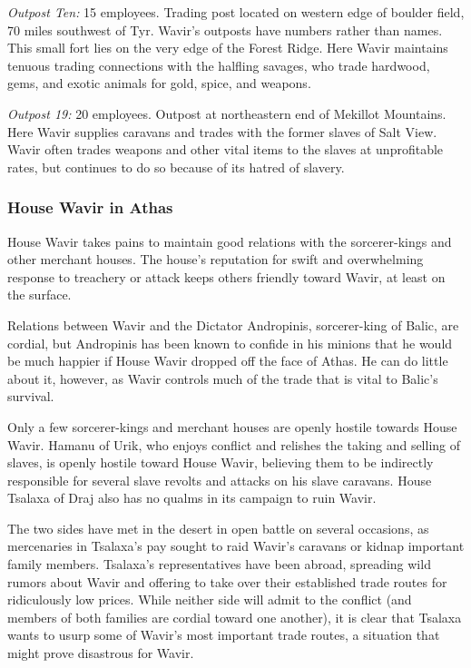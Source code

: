 \textit{Outpost Ten:} 15 employees. Trading post located on western edge of boulder field, 70 miles southwest of Tyr. Wavir's outposts have numbers rather than names. This small fort lies on the very edge of the Forest Ridge. Here Wavir maintains tenuous trading connections with the halfling savages, who trade hardwood, gems, and exotic animals for gold, spice, and weapons.

\textit{Outpost 19:} 20 employees. Outpost at northeastern end of Mekillot Mountains. Here Wavir supplies caravans and trades with the former slaves of Salt View. Wavir often trades weapons and other vital items to the slaves at unprofitable rates, but continues to do so because of its hatred of slavery.

\subsubsection{House Wavir in Athas}
House Wavir takes pains to maintain good relations with the sorcerer-kings and other merchant houses. The house's reputation for swift and overwhelming response to treachery or attack keeps others friendly toward Wavir, at least on the surface.

Relations between Wavir and the Dictator Andropinis, sorcerer-king of Balic, are cordial, but Andropinis has been known to confide in his minions that he would be much happier if House Wavir dropped off the face of Athas. He can do little about it, however, as Wavir controls much of the trade that is vital to Balic's survival.

Only a few sorcerer-kings and merchant houses are openly hostile towards House Wavir. Hamanu of Urik, who enjoys conflict and relishes the taking and selling of slaves, is openly hostile toward House Wavir, believing them to be indirectly responsible for several slave revolts and attacks on his slave caravans. House Tsalaxa of Draj also has no qualms in its campaign to ruin Wavir.

The two sides have met in the desert in open battle on several occasions, as mercenaries in Tsalaxa's pay sought to raid Wavir's caravans or kidnap important family members. Tsalaxa's representatives have been abroad, spreading wild rumors about Wavir and offering to take over their established trade routes for ridiculously low prices. While neither side will admit to the conflict (and members of both families are cordial toward one another), it is clear that Tsalaxa wants to usurp some of Wavir's most important trade routes, a situation that might prove disastrous for Wavir.


